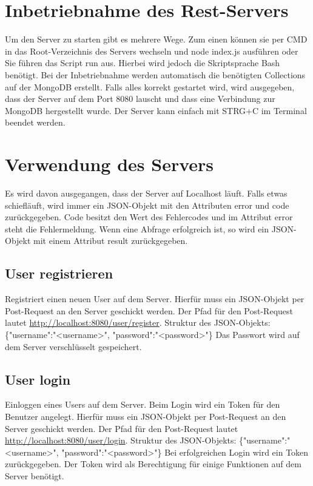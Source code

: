 \documentclass[12pt]{scrartcl}
\begin{document}
    \section{Inbetriebnahme des Rest-Servers}
        Um den Server zu starten gibt es mehrere Wege. 
        Zum einen können sie per CMD in das Root-Verzeichnis des Servers wechseln und node index.js ausführen oder 
        Sie führen das Script run aus. Hierbei wird jedoch die Skriptsprache Bash benötigt.
        Bei der Inbetriebnahme werden automatisch die benötigten Collections auf der MongoDB erstellt. 
        Falls alles korrekt gestartet wird, wird ausgegeben, dass der Server auf dem Port 8080 lauscht
        und dass eine Verbindung zur MongoDB hergestellt wurde.
        Der Server kann einfach mit STRG+C im Terminal beendet werden.    
    \section{Verwendung des Servers}
        Es wird davon ausgegangen, dass der Server auf Localhost läuft.
        Falls etwas schiefläuft, wird immer ein JSON-Objekt mit den Attributen error und code zurückgegeben.
        Code besitzt den Wert des Fehlercodes und im Attribut error steht die Fehlermeldung.
        Wenn eine Abfrage erfolgreich ist, so wird ein JSON-Objekt mit einem Attribut result zurückgegeben.
    \subsection{User registrieren}
        Registriert einen neuen User auf dem Server.
        Hierfür muss ein JSON-Objekt per Post-Request an den Server geschickt werden. Der Pfad für den Post-Request lautet
        \url{http://localhost:8080/user/register}.
        Struktur des JSON-Objekts: \{"username":"<username>", "password":"<password>"\}
        Das Passwort wird auf dem Server verschlüsselt gespeichert.

    \subsection{User login}
        Einloggen eines Users auf dem Server. Beim Login wird ein Token für den Benutzer angelegt.
        Hierfür muss ein JSON-Objekt per Post-Request an den Server geschickt werden. Der Pfad für den Post-Request lautet
        \url{http://localhost:8080/user/login}.
        Struktur des JSON-Objekts: \{"username":"<username>", "password":"<password>"\}
        Bei erfolgreichen Login wird ein Token zurückgegeben. Der Token wird als Berechtigung für einige Funktionen auf dem Server benötigt.
    
\end{document}
